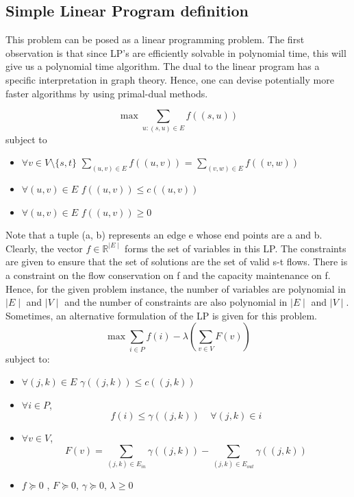 \documentclass[BTech]{iitmdiss}
\begin{document}
	\subsection{Simple Linear Program definition}
	  This problem can be posed as a linear programming problem. The first observation is that since LP's are efficiently solvable in polynomial
	  time, this will give us a polynomial time algorithm. The dual to the linear
	  program has a specific interpretation in graph theory. Hence, one can devise potentially more faster algorithms by using primal-dual
	  methods.
	  
	  $$\max \displaystyle\sum_{u:(s,u) \in E} f((s,u))$$
	  subject to
	  \begin{itemize}
	   \item
	      $\forall v \in V \setminus \{s,t\}$ $\displaystyle\sum_{(u,v) \in E} f((u,v))$ = $\displaystyle\sum_{(v,w) \in E} f((v,w))$
	   \item
	      $\forall (u,v) \in E$ $f((u,v)) \leq c((u,v))$
	   \item
	      $\forall(u,v) \in E$ $f((u,v)) \geq 0$
	      
	  \end{itemize}
	  
	  Note that a tuple (a, b) represents an edge e whose end points are a and b. \\
	  
	  Clearly, the vector $f \in \mathbb{R}^{\mid E\mid }$ forms the set of variables in this LP. The constraints are given to ensure that the set of 
	  solutions are the set of valid s-t flows. There is a constraint on the flow conservation on f and the capacity maintenance on f. Hence, for the
	  given problem instance, the number of variables are polynomial in $\mid E\mid $ and $\mid V\mid $ and the number of constraints are also polynomial in $\mid E\mid $
	  and $\mid V\mid $. \\
	  
	  Sometimes, an alternative formulation of the LP is given for this problem. 
	  $$ \max \displaystyle\sum_{i \in P} f(i) - \lambda (\displaystyle\sum_{v \in V} F(v)) $$
	  subject to:
	  
	  \begin{itemize}
	   \item 
	      $\forall (j,k) \in E$  $\gamma((j,k)) \leq c((j,k))$
	   \item
	      $\forall i \in P$, 
		$$f(i) \leq \gamma((j,k))~~~~~\forall (j,k) \in i$$
	   \item
	      $\forall v \in V$,
	      $$F(v) = \displaystyle\sum_{(j,k) \in E_{in}} \gamma((j,k)) - \displaystyle\sum_{(j,k) \in E_{out}} \gamma((j,k))$$
	   \item
	      $f \succeq 0$ , $F \succeq 0$, $\gamma \succeq 0$, $\lambda \geq 0$
	  \end{itemize}
	  
\end{document}
